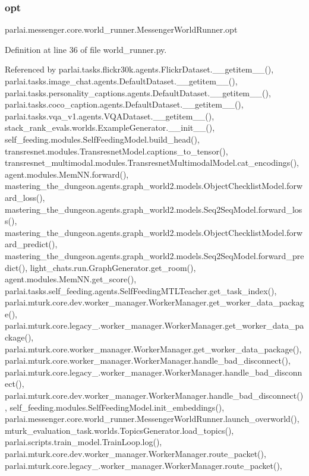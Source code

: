 \subsubsection{\texorpdfstring{opt}{opt}}
{\footnotesize\ttfamily parlai.\+messenger.\+core.\+world\+\_\+runner.\+Messenger\+World\+Runner.\+opt}



Definition at line 36 of file world\+\_\+runner.\+py.



Referenced by parlai.\+tasks.\+flickr30k.\+agents.\+Flickr\+Dataset.\+\_\+\+\_\+getitem\+\_\+\+\_\+(), parlai.\+tasks.\+image\+\_\+chat.\+agents.\+Default\+Dataset.\+\_\+\+\_\+getitem\+\_\+\+\_\+(), parlai.\+tasks.\+personality\+\_\+captions.\+agents.\+Default\+Dataset.\+\_\+\+\_\+getitem\+\_\+\+\_\+(), parlai.\+tasks.\+coco\+\_\+caption.\+agents.\+Default\+Dataset.\+\_\+\+\_\+getitem\+\_\+\+\_\+(), parlai.\+tasks.\+vqa\+\_\+v1.\+agents.\+V\+Q\+A\+Dataset.\+\_\+\+\_\+getitem\+\_\+\+\_\+(), stack\+\_\+rank\+\_\+evals.\+worlds.\+Example\+Generator.\+\_\+\+\_\+init\+\_\+\+\_\+(), self\+\_\+feeding.\+modules.\+Self\+Feeding\+Model.\+build\+\_\+head(), transresnet.\+modules.\+Transresnet\+Model.\+captions\+\_\+to\+\_\+tensor(), transresnet\+\_\+multimodal.\+modules.\+Transresnet\+Multimodal\+Model.\+cat\+\_\+encodings(), agent.\+modules.\+Mem\+N\+N.\+forward(), mastering\+\_\+the\+\_\+dungeon.\+agents.\+graph\+\_\+world2.\+models.\+Object\+Checklist\+Model.\+forward\+\_\+loss(), mastering\+\_\+the\+\_\+dungeon.\+agents.\+graph\+\_\+world2.\+models.\+Seq2\+Seq\+Model.\+forward\+\_\+loss(), mastering\+\_\+the\+\_\+dungeon.\+agents.\+graph\+\_\+world2.\+models.\+Object\+Checklist\+Model.\+forward\+\_\+predict(), mastering\+\_\+the\+\_\+dungeon.\+agents.\+graph\+\_\+world2.\+models.\+Seq2\+Seq\+Model.\+forward\+\_\+predict(), light\+\_\+chats.\+run.\+Graph\+Generator.\+get\+\_\+room(), agent.\+modules.\+Mem\+N\+N.\+get\+\_\+score(), parlai.\+tasks.\+self\+\_\+feeding.\+agents.\+Self\+Feeding\+M\+T\+L\+Teacher.\+get\+\_\+task\+\_\+index(), parlai.\+mturk.\+core.\+dev.\+worker\+\_\+manager.\+Worker\+Manager.\+get\+\_\+worker\+\_\+data\+\_\+package(), parlai.\+mturk.\+core.\+legacy\+\_.\+worker\+\_\+manager.\+Worker\+Manager.\+get\+\_\+worker\+\_\+data\+\_\+package(), parlai.\+mturk.\+core.\+worker\+\_\+manager.\+Worker\+Manager.\+get\+\_\+worker\+\_\+data\+\_\+package(), parlai.\+mturk.\+core.\+worker\+\_\+manager.\+Worker\+Manager.\+handle\+\_\+bad\+\_\+disconnect(), parlai.\+mturk.\+core.\+legacy\+\_.\+worker\+\_\+manager.\+Worker\+Manager.\+handle\+\_\+bad\+\_\+disconnect(), parlai.\+mturk.\+core.\+dev.\+worker\+\_\+manager.\+Worker\+Manager.\+handle\+\_\+bad\+\_\+disconnect(), self\+\_\+feeding.\+modules.\+Self\+Feeding\+Model.\+init\+\_\+embeddings(), parlai.\+messenger.\+core.\+world\+\_\+runner.\+Messenger\+World\+Runner.\+launch\+\_\+overworld(), mturk\+\_\+evaluation\+\_\+task.\+worlds.\+Topics\+Generator.\+load\+\_\+topics(), parlai.\+scripts.\+train\+\_\+model.\+Train\+Loop.\+log(), parlai.\+mturk.\+core.\+dev.\+worker\+\_\+manager.\+Worker\+Manager.\+route\+\_\+packet(), parlai.\+mturk.\+core.\+legacy\+\_.\+worker\+\_\+manager.\+Worker\+Manager.\+route\+\_\+packet(), 